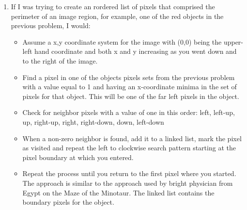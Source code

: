 \documentclass{article}
\begin{document}
\begin{enumerate}
\item
If I was trying to create an rordered list of pixels that comprised the perimeter of an image region, for example, one of the red objects in the previous problem, I would:
\begin{itemize}
\item
Assume a x,y coordinate system for the image with (0,0) being the upper-left hand coordinate and both x and y increasing as you went down and to the right of the image.
\item
Find a pixel in one of the objects pixels sets from the previous problem with a value equal to 1 and having an x-coordinate minima in the set of pixels for that object. This will be one of the far left pixels in the object.
\item
Check for neighbor pixels with a value of one in this order: left, left-up, up, right-up, right, right-down, down, left-down
\item
When a non-zero neighbor is found, add it to a linked list, mark the pixel as visited and repeat the left to clockwise search pattern starting at the pixel boundary at which you entered.
\item
Repeat the process until you return to the first pixel where you started. The approach is similar to the approach used by bright physician from Egypt on the Maze of the Minotaur. The linked list contains the boundary pixels for the object.
\end{itemize}

\end{enumerate}
\end{document}
